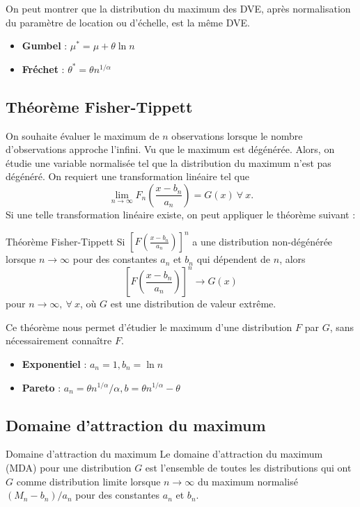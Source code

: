 On peut montrer que la distribution du maximum des DVE, après normalisation du paramètre de location ou d'échelle, est la même DVE.

\begin{itemize}
	\item \textbf{Gumbel} : $\mu^* = \mu + \theta \ln n$
	\item \textbf{Fréchet} : $\theta^* = \theta n^{1/\alpha}$
\end{itemize}

\subsection{Théorème Fisher-Tippett}

On souhaite évaluer le maximum de $n$ observations lorsque le nombre d'observations approche l'infini. Vu que le maximum est dégénérée. Alors, on étudie une variable normalisée tel que la distribution du maximum n'est pas dégénéré. On requiert une transformation linéaire tel que 
$$\lim\limits_{n\to\infty} F_{n}\left(\frac{x - b_n}{a_n}\right) = G(x) ~ \forall~ x.$$
Si une telle transformation linéaire existe, on peut appliquer le théorème suivant : 

\begin{theoreme}{Théorème Fisher-Tippett}{}
	Si $\left[F\left(\frac{x - b_n}{a_n}\right)\right]^n$ a une distribution non-dégénérée lorsque $n\to\infty$ pour des constantes $a_n$ et $b_n$ qui dépendent de $n$, alors 
	$$\left[F\left(\frac{x - b_n}{a_n}\right)\right]^n \to G(x)$$
	pour $n\to \infty, ~\forall ~ x$, où $G$ est une distribution de valeur extrême. 
\end{theoreme}

Ce théorème nous permet d'étudier le maximum d'une distribution $F$ par $G$, sans nécessairement connaître $F$. 

\begin{itemize}
	\item \textbf{Exponentiel} : $a_n = 1, b_n = \ln n$
	\item \textbf{Pareto} : $a_n = \theta n^{1/\alpha}/\alpha, b = \theta n^{1/\alpha} - \theta$
\end{itemize}

\subsection{Domaine d'attraction du maximum}

\begin{definition}{Domaine d'attraction du maximum}{}
	Le domaine d'attraction du maximum (MDA) pour une distribution $G$ est l'ensemble de toutes les distributions qui ont $G$ comme distribution limite lorsque $n\to \infty$ du maximum normalisé $(M_n - b_n)/a_n$ pour des constantes $a_n$ et $b_n$. 
\end{definition}

